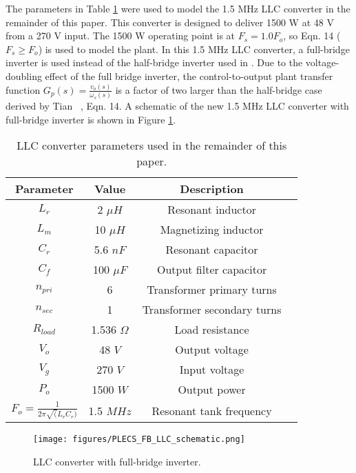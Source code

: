 \documentclass[journal]{IEEEtran}
\begin{document}
The parameters in Table \ref{tab:llc_parameters} were used to model the 1.5 MHz LLC converter in the remainder of this paper. 
This converter is designed to deliver 1500 W at 48 V from a 270 V input.
The 1500 W operating point is at $F_s = 1.0 F_o$, so \cite{tian_equivalent_2020} Eqn. 14 ($F_s \ge F_o$) is used to model the plant. 
In this 1.5 MHz LLC converter, a full-bridge inverter is used instead of the half-bridge inverter used in \cite{tian_equivalent_2020}.
Due to the voltage-doubling effect of the full bridge inverter, the control-to-output plant transfer function $G_p(s) = \frac{v_o(s)}{\omega_s(s)}$ is a factor of two larger than the half-bridge case derived by Tian ~\cite{tian_equivalent_2020}, Eqn. 14. 
A schematic of the new 1.5 MHz LLC converter with full-bridge inverter is shown in Figure \ref{fig:PLECS_FB_LLC}.

\begin{table}[H]
\centering
\begin{tabular}{|c|c|c|c|}
\hline
\textbf{Parameter} & \textbf{Value}  & \textbf{Description} \\ \hline
$L_r$ & 2 $\mu H$ & Resonant inductor \\ \hline
$L_m$ & 10 $\mu H$ & Magnetizing inductor \\ \hline
$C_r$ & 5.6 $nF$ & Resonant capacitor \\ \hline
$C_f$ & 100 $\mu F$ & Output filter capacitor \\ \hline
$n_{pri}$ & 6 & Transformer primary turns \\ \hline
$n_{sec}$ & 1 & Transformer secondary turns \\ \hline
$R_{load}$ & 1.536 $\Omega$ & Load resistance \\ \hline
$V_{o}$ & 48 $V$ & Output voltage \\ \hline
$V_{g}$ & 270 $V$ & Input voltage \\ \hline
$P_{o}$ & 1500 $W$ & Output power \\ \hline
$F_{o} = \frac{1}{2\pi\sqrt(L_r C_r)}$ & 1.5 $MHz$ & Resonant tank frequency \\ \hline
\end{tabular}
\caption{LLC converter parameters used in the remainder of this paper.}
\label{tab:llc_parameters}
\end{table}

\begin{figure}
  \centering
  \texttt{[image: figures/PLECS\_FB\_LLC\_schematic.png]}
  \caption{LLC converter with full-bridge inverter.}
  \label{fig:PLECS_FB_LLC}
\end{figure}
\end{document}
